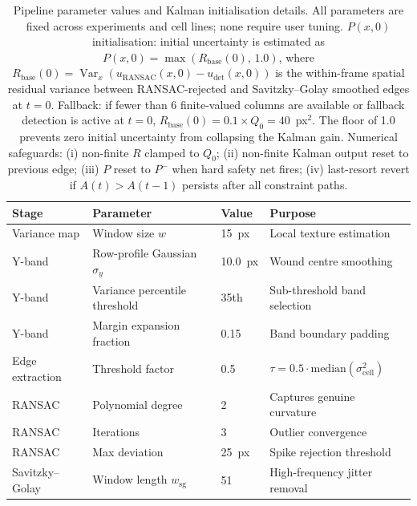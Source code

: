 \begin{table}[H]
\centering
\caption{Pipeline parameter values and Kalman initialisation details.
  All parameters are fixed across experiments and cell lines; none require user tuning.
  $P(x,0)$ initialisation: initial uncertainty is estimated as
  $P(x,0) = \max(R_\text{base}(0),\, 1.0)$, where
  $R_\text{base}(0) = \operatorname{Var}_x(u_\text{RANSAC}(x,0) - u_\text{det}(x,0))$
  is the within-frame spatial residual variance between RANSAC-rejected and
  Savitzky--Golay smoothed edges at $t = 0$.
  Fallback: if fewer than 6 finite-valued columns are available or fallback detection
  is active at $t = 0$, $R_\text{base}(0) = 0.1 \times Q_0 = 40$~px$^2$.
  The floor of 1.0 prevents zero initial uncertainty from collapsing the Kalman gain.
  Numerical safeguards: (i) non-finite $R$ clamped to $Q_0$;
  (ii) non-finite Kalman output reset to previous edge;
  (iii) $P$ reset to $P^-$ when hard safety net fires;
  (iv) last-resort revert if $A(t) > A(t-1)$ persists after all constraint paths.}
\label{tab:pipeline-parameters}
\small
\begin{tabular}{llll}
\toprule
Stage & Parameter & Value & Purpose \\
\midrule
Variance map        & Window size $w$                          & 15~px         & Local texture estimation \\
Y-band              & Row-profile Gaussian $\sigma_y$          & 10.0~px       & Wound centre smoothing \\
Y-band              & Variance percentile threshold            & 35th          & Sub-threshold band selection \\
Y-band              & Margin expansion fraction                & 0.15          & Band boundary padding \\
Edge extraction     & Threshold factor                         & 0.5           & $\tau = 0.5 \cdot \text{median}(\sigma^2_\text{cell})$ \\
RANSAC              & Polynomial degree                        & 2             & Captures genuine curvature \\
RANSAC              & Iterations                               & 3             & Outlier convergence \\
RANSAC              & Max deviation                            & 25~px         & Spike rejection threshold \\
Savitzky--Golay     & Window length $w_\text{sg}$              & 51            & High-frequency jitter removal \\

\end{tabular}
\end{table}
